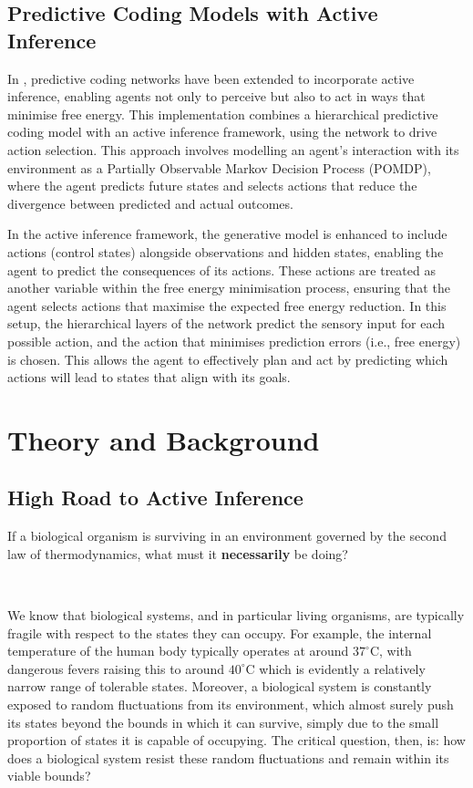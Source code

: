 \documentclass{article}
\begin{document}
\subsection{Predictive Coding Models with Active Inference}


In \citet{millidge2019combining}, predictive coding networks have been extended to incorporate active inference, enabling agents not only to perceive but also to act in ways that minimise free energy. This implementation combines a hierarchical predictive coding model with an active inference framework, using the network to drive action selection. This approach involves modelling an agent's interaction with its environment as a Partially Observable Markov Decision Process (POMDP), where the agent predicts future states and selects actions that reduce the divergence between predicted and actual outcomes.

In the active inference framework, the generative model is enhanced to include actions (control states) alongside observations and hidden states, enabling the agent to predict the consequences of its actions. These actions are treated as another variable within the free energy minimisation process, ensuring that the agent selects actions that maximise the expected free energy reduction. In this setup, the hierarchical layers of the network predict the sensory input for each possible action, and the action that minimises prediction errors (i.e., free energy) is chosen. This allows the agent to effectively plan and act by predicting which actions will lead to states that align with its goals.

\section{Theory and Background}

\subsection{High Road to Active Inference}

If a biological organism is surviving in an environment governed by the second law of thermodynamics, what must it \textbf{necessarily} be doing? 

\

We know that biological systems, and in particular living organisms, are typically fragile with respect to the states they can occupy. For example, the internal temperature of the human body typically operates at around $37^\circ$C, with dangerous fevers raising this to around $40^\circ$C which is evidently a relatively narrow range of tolerable states. Moreover, a biological system is constantly exposed to random fluctuations from its environment, which almost surely push its states beyond the bounds in which it can survive, simply due to the small proportion of states it is capable of occupying. \citep{friston2012free} The critical question, then, is: how does a biological system resist these random fluctuations and remain within its viable bounds?
\end{document}
